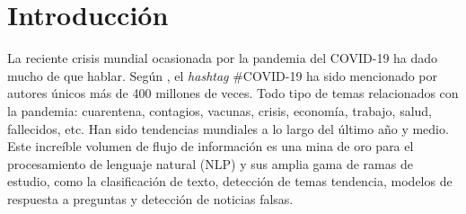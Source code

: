 \section{Introducción}

La reciente crisis mundial ocasionada por la pandemia del COVID-19 ha dado mucho de que hablar. Según \cite{Twitter_blog}, el \textit{hashtag} \#COVID-19 ha sido mencionado por autores únicos más de 400 millones de veces. Todo tipo de temas relacionados con la pandemia: cuarentena, contagios, vacunas, crisis, economía, trabajo, salud, fallecidos, etc. Han sido tendencias mundiales a lo largo del último año y medio. Este increíble volumen de flujo de información es una mina de oro para el procesamiento de lenguaje natural (NLP) y sus amplia gama de ramas de estudio, como la clasificación de texto, detección de temas tendencia, modelos de respuesta a preguntas y detección de noticias falsas.\\



\newpage
